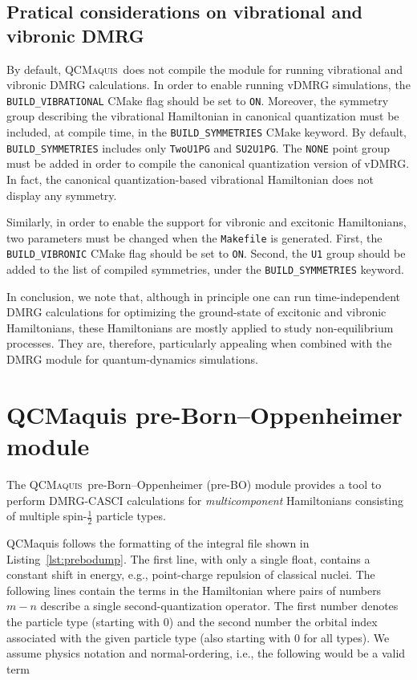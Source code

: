 \documentclass[bibliography=totoc,12pt,a4paper]{scrartcl}
\newcommand{\qcm}{\textsc{QCMaquis}}
\begin{document}
\subsection{Pratical considerations on vibrational and vibronic DMRG}
\label{sec:Practical-vDMRG}

By default, \qcm\ does not compile the module for running vibrational and vibronic DMRG calculations.
In order to enable running vDMRG simulations, the \texttt{BUILD\_VIBRATIONAL} CMake flag should be set to \texttt{ON}.
Moreover, the symmetry group describing the vibrational Hamiltonian in canonical quantization must be included, at compile time, in the \texttt{BUILD\_SYMMETRIES} CMake keyword.
By default, \texttt{BUILD\_SYMMETRIES} includes only \texttt{TwoU1PG} and \texttt{SU2U1PG}.
The \texttt{NONE} point group must be added in order to compile the canonical quantization version of vDMRG.
In fact, the canonical quantization-based vibrational Hamiltonian does not display any symmetry.

Similarly, in order to enable the support for vibronic and excitonic Hamiltonians, two parameters must be changed when the \texttt{Makefile} is generated.
First, the \texttt{BUILD\_VIBRONIC} CMake flag should be set to \texttt{ON}.
Second, the \texttt{U1} group should be added to the list of compiled symmetries, under the \texttt{BUILD\_SYMMETRIES} keyword.

In conclusion, we note that, although in principle one can run time-independent DMRG calculations for optimizing the ground-state of excitonic and vibronic Hamiltonians, these Hamiltonians are mostly applied to study non-equilibrium processes.
They are, therefore, particularly appealing when combined with the DMRG module for quantum-dynamics simulations.

\section{QCMaquis pre-Born--Oppenheimer module}
\label{sec:preBO}

The \qcm\ pre-Born--Oppenheimer (pre-BO) module provides a tool to perform DMRG-CASCI calculations for \textit{multicomponent} Hamiltonians consisting of multiple spin-$\frac12$ particle types.

QCMaquis follows the formatting of the integral file shown in Listing~\ref{lst:prebodump}.
The first line, with only a single float, contains a constant shift in energy, e.g., point-charge repulsion of classical nuclei.
The following lines contain the terms in the Hamiltonian where pairs of numbers $m-n$ describe a single second-quantization operator.
The first number denotes the particle type (starting with 0) and the second number the orbital index associated with the given particle type (also starting with 0 for all types).
We assume physics notation and normal-ordering, i.e., the following would be a valid term
\end{document}
